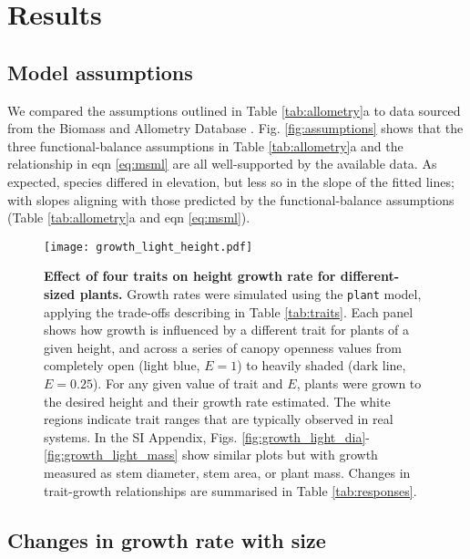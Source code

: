 \documentclass[9pt,twocolumn,twoside,lineno]{pnas-new}
\newcommand{\plant}{\texttt{plant}}
\begin{document}
\section*{Results}

\subsection*{Model assumptions}

We compared the assumptions outlined in Table \ref{tab:allometry}a to data sourced from the Biomass and Allometry Database \citep[\textsc{baad}][]{Falster-2015b}. Fig. \ref{fig:assumptions} shows that the three functional-balance assumptions in Table \ref{tab:allometry}a and the relationship in eqn \ref{eq:msml} are all well-supported by the available data. As expected, species differed in elevation, but less so in the slope of the fitted lines; with slopes aligning with those predicted by the functional-balance assumptions (Table \ref{tab:allometry}a and eqn \ref{eq:msml}).

\begin{SCfigure*}[\sidecaptionrelwidth][!ht]
\centering
\texttt{[image: growth\_light\_height.pdf]}
\caption{\textbf{Effect of four traits on height growth rate for different-sized plants.}
Growth rates were simulated using the {\plant} model, applying the trade-offs describing in Table \ref{tab:traits}. Each panel shows how growth is influenced by a different trait for plants of a given height, and across a series of canopy openness values from completely open (light blue,  $E=1$) to heavily shaded (dark line, $E=0.25$). For any given value of trait and $E$, plants were grown to the desired height and their growth rate estimated. The white regions indicate trait ranges that are typically observed in real systems. In the SI Appendix, Figs. \ref{fig:growth_light_dia}-\ref{fig:growth_light_mass} show similar plots but with growth measured as stem diameter, stem area, or plant mass. Changes in trait-growth relationships are summarised in Table \ref{tab:responses}.
\label{fig:growth_light_height}}
\end{SCfigure*}

\subsection*{Changes in growth rate with size}
\end{document}
